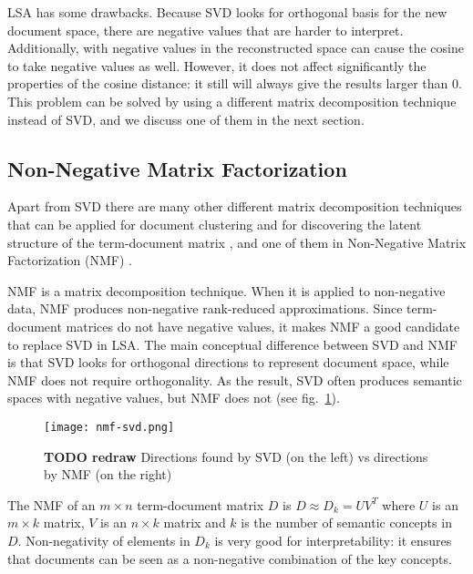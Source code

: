 LSA has some drawbacks. Because SVD looks for orthogonal basis 
for the new document space, there are negative values that are harder
to interpret. Additionally, with negative values in the reconstructed 
space can cause the cosine to take negative values as well. 
However, it does not affect significantly the properties of the 
cosine distance: it still will always give the results larger than 0. 
This problem can be solved by using a different matrix decomposition
technique instead of SVD, and we discuss one of them in the next
section. 




\subsection{Non-Negative Matrix Factorization} \label{sec:nmf}

Apart from SVD there are many other different matrix decomposition 
techniques that can be applied for document clustering and for discovering 
the latent structure of the term-document matrix \cite{osinski2006improving},
and one of them in Non-Negative Matrix Factorization (NMF) \cite{lee1999nnmf}. 


NMF is a matrix decomposition technique. When it is applied to non-negative
data, NMF produces non-negative rank-reduced approximations. 
Since term-document matrices do not have negative values, it makes 
NMF a good candidate to replace SVD in LSA. The main conceptual difference 
between SVD and NMF is that SVD looks for orthogonal directions to 
represent document space, while NMF does not require orthogonality.
As the result, SVD often produces semantic spaces with negative values, 
but NMF does not \cite{xu2003document} (see fig.~\ref{fig:nmf-svd}).


\begin{figure}[h]
\centering\texttt{[image: nmf-svd.png]}
\caption{\textbf{TODO redraw} Directions found by  SVD (on the left) vs directions by NMF (on the right)}
\label{fig:nmf-svd}
\end{figure}


The NMF of an $m \times n$ term-document matrix $D$ is $D \approx D_k = U  V^T$ 
where $U$ is an $m \times k$ matrix, $V$ is an $n \times k$ matrix and  
$k$ is the number of semantic concepts in $D$.
Non-negativity of elements in $D_k$ is very good for interpretability: it 
ensures that documents can be seen as a non-negative combination of 
the key concepts.


